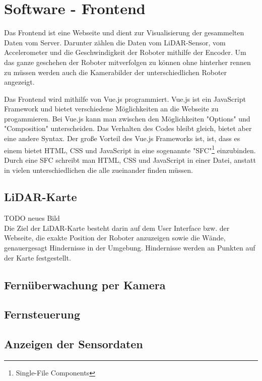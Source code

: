 
\section{Software - Frontend}
\label{sec:software_frontend}
Das Frontend ist eine Webseite und dient zur Visualisierung der gesammelten Daten vom Server.
Darunter zählen die Daten vom LiDAR-Sensor, vom Accelerometer und die Geschwindigkeit der Roboter
mithilfe der Encoder. Um das ganze geschehen der Roboter mitverfolgen zu können ohne hinterher rennen zu müssen
werden auch die Kamerabilder der unterschiedlichen Roboter angezeigt.

Das Frontend wird mithilfe von Vue.js programmiert. Vue.js ist ein JavaScript Framework und bietet 
verschiedene Möglichkeiten an die Webseite zu progammieren. Bei Vue.js kann man zwischen den Möglichkeiten "Options" und "Composition" unterscheiden.
Das Verhalten des Codes bleibt gleich, bietet aber eine andere Syntax. Der große Vorteil des Vue.js Frameworks ist, ist, dass es einem bietet 
HTML, CSS und JavaScript in eine sogenannte "SFC"\footnote{Single-File Components} einzubinden. Durch eine SFC schreibt man HTML, CSS und JavaScript in einer Datei, anstatt in vielen unterschiedlichen
die alle zueinander finden müssen.  

\subsection{LiDAR-Karte}
\label{subsec:frontend_lidar_map}
TODO neues Bild
\\
Die Ziel der LiDAR-Karte besteht darin auf dem User Interface bzw. der Webseite, die exakte
Position der Roboter anzuzeigen sowie die Wände, genauergesagt Hindernisse in der Umgebung. Hindernisse werden an Punkten auf der Karte festgestellt.


\subsection{Fernüberwachung per Kamera}
\label{subsec:frontend_cam_stream}

\subsection{Fernsteuerung}
\label{subsec_frontend_control}

\subsection{Anzeigen der Sensordaten}
\label{subsec:frontend_sensors}